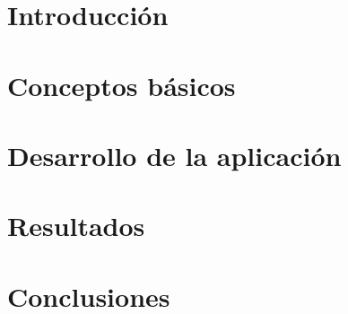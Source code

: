 



	\begin{titlepage}
		
	\end{titlepage}
	
    \section{Introducción}
        
    \section{Conceptos básicos}
        
    \section{Desarrollo de la aplicación}
        
		\newpage        
        
    \section{Resultados}
        
        \newpage
        
    \section{Conclusiones}
        
        \newpage



